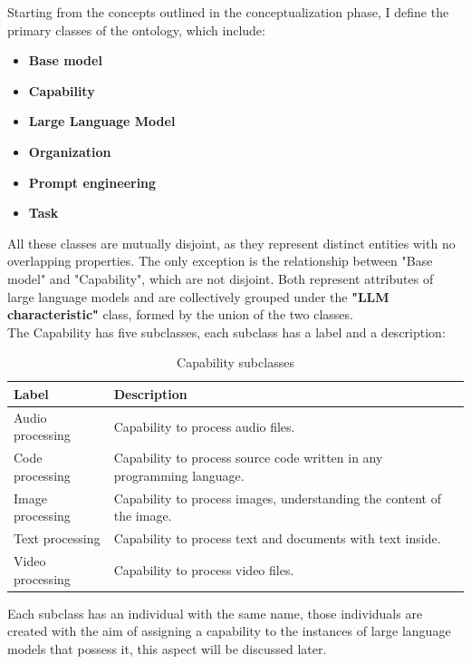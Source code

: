 Starting from the concepts outlined in the conceptualization phase, I define the primary classes of the ontology, which include:
\begin{itemize}
    \item \textbf{Base model}

    \item \textbf{Capability}

    \item \textbf{Large Language Model}

    \item \textbf{Organization}

    \item \textbf{Prompt engineering}

    \item \textbf{Task}
\end{itemize}
All these classes are mutually disjoint, as they represent distinct entities with no overlapping properties. The only exception is the relationship between "Base model" and "Capability", which are not disjoint. Both represent attributes of large language models and are collectively grouped under the \textbf{"LLM characteristic"} class, formed by the union of the two classes. \\
The Capability has five subclasses, each subclass has a label and a description:
\begin{table}[H]
    \centering
    \begin{tabular}{|>{\raggedright\arraybackslash}p{6cm}|>{\raggedright\arraybackslash}p{6cm}|}
        \hline
        \textbf{Label} & \textbf{Description} \\ \hline
         Audio processing &  Capability to process audio files. \\ \hline
         
         Code processing & Capability to process source code written in any programming language. \\ \hline
         
         Image processing & Capability to process images, understanding the content of the image. \\ \hline
         
         Text processing & Capability to process text and documents with text inside. \\ \hline
         
         Video processing & Capability to process video files. \\ \hline
    \end{tabular}
    \caption{Capability subclasses}
\end{table}
Each subclass has an individual with the same name, those individuals are created with the aim of assigning a capability to the instances of large language models that possess it, this aspect will be discussed later.

